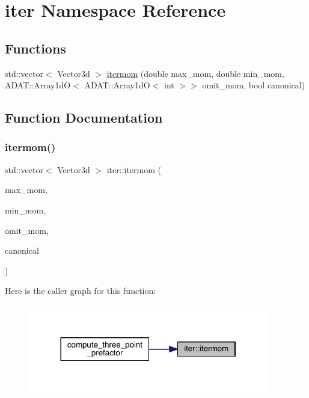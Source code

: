 \hypertarget{namespaceiter}{}\section{iter Namespace Reference}
\label{namespaceiter}
\subsection*{Functions}
\begin{DoxyCompactItemize}
\item 
std\+::vector$<$ Vector3d $>$ \mbox{\hyperlink{namespaceiter_a6df5db1fc5cd1a5383020ab6c9ea5089}{itermom}} (double max\+\_\+mom, double min\+\_\+mom, A\+D\+A\+T\+::\+Array1dO$<$ A\+D\+A\+T\+::\+Array1dO$<$ int $>$$>$ omit\+\_\+mom, bool canonical)
\end{DoxyCompactItemize}


\subsection{Function Documentation}
\mbox{\label{namespaceiter_a6df5db1fc5cd1a5383020ab6c9ea5089}} 
\subsubsection{\texorpdfstring{itermom()}{itermom()}}
{\footnotesize\ttfamily std\+::vector$<$ Vector3d $>$ iter\+::itermom (\begin{DoxyParamCaption}\item[{double}]{max\+\_\+mom,  }\item[{double}]{min\+\_\+mom,  }\item[{A\+D\+A\+T\+::\+Array1dO$<$ A\+D\+A\+T\+::\+Array1dO$<$ int $>$$>$}]{omit\+\_\+mom,  }\item[{bool}]{canonical }\end{DoxyParamCaption})}

Here is the caller graph for this function\+:\nopagebreak
\begin{figure}[H]
\begin{center}
\leavevmode
\includegraphics[width=298pt]{d1/d0f/namespaceiter_a6df5db1fc5cd1a5383020ab6c9ea5089_icgraph}
\end{center}
\end{figure}
